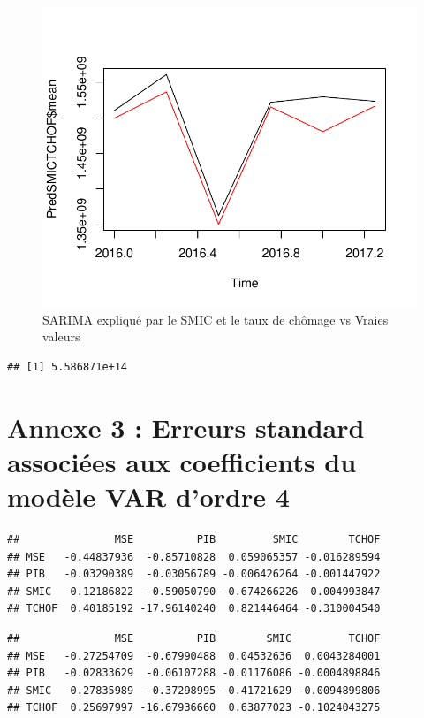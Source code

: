 \documentclass[11pt,]{article}
\begin{document}
\begin{figure}

{\centering \includegraphics{Rapport_final_files/figure-latex/unnamed-chunk-60-1} 

}

\caption{\label{fig36} SARIMA expliqué par le SMIC et le taux de chômage vs Vraies valeurs}\label{fig:unnamed-chunk-60}
\end{figure}

\begin{verbatim}
## [1] 5.586871e+14
\end{verbatim}

\section{\texorpdfstring{Annexe 3 : Erreurs standard associées aux
coefficients du modèle VAR d'ordre 4
\label{Annexe3}}{Annexe 3 : Erreurs standard associées aux coefficients du modèle VAR d'ordre 4 }}\label{annexe-3-erreurs-standard-associees-aux-coefficients-du-modele-var-dordre-4}

\begin{verbatim}
##               MSE          PIB         SMIC        TCHOF
## MSE   -0.44837936  -0.85710828  0.059065357 -0.016289594
## PIB   -0.03290389  -0.03056789 -0.006426264 -0.001447922
## SMIC  -0.12186822  -0.59050790 -0.674266226 -0.004993847
## TCHOF  0.40185192 -17.96140240  0.821446464 -0.310004540
\end{verbatim}

\begin{verbatim}
##               MSE          PIB        SMIC         TCHOF
## MSE   -0.27254709  -0.67990488  0.04532636  0.0043284001
## PIB   -0.02833629  -0.06107288 -0.01176086 -0.0004898846
## SMIC  -0.27835989  -0.37298995 -0.41721629 -0.0094899806
## TCHOF  0.25697997 -16.67936660  0.63877023 -0.1024043275
\end{verbatim}
\end{document}

